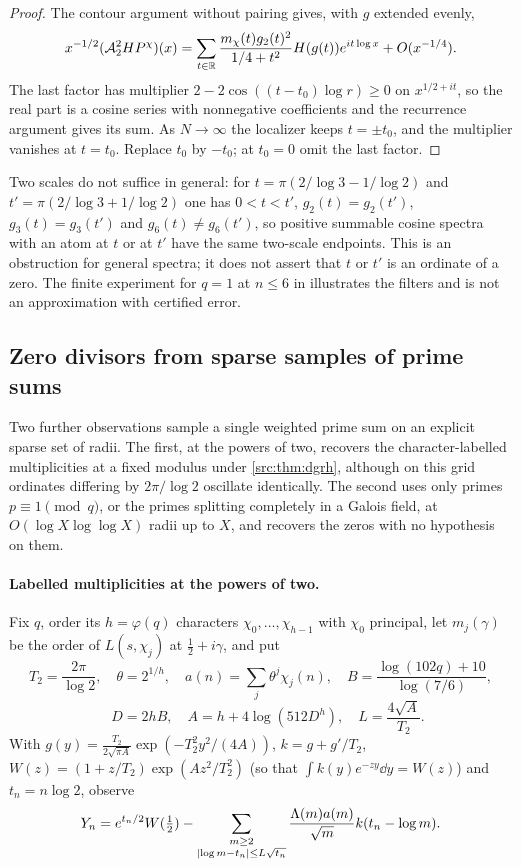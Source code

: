 \begin{proof}
The contour argument without pairing gives, with $g$ extended evenly,
\[
 x^{-1/2}(\mathcal{A}_2^2HP^\chi)(x)=\sum_{t\in\mathbb{R}}\frac{m_\chi(t)g_2(t)^2}{1/4+t^2}H(g(t))e^{it\log x}+O(x^{-1/4}).
\] The last factor has multiplier $2-2\cos((t-t_0)\log r)\ge0$ on
$x^{1/2+it}$, so the real part is a cosine series with nonnegative coefficients and the recurrence
argument gives its sum. As $N\to\infty$ the localizer keeps $t=\pm t_0$, and the multiplier vanishes
at $t=t_0$. Replace $t_0$ by $-t_0$; at $t_0=0$ omit the last factor.
\end{proof}

Two scales do not suffice in general: for $t=\pi(2/\log3-1/\log2)$ and $t'=\pi(2/\log3+1/\log2)$
one has $0<t<t'$, $g_2(t)=g_2(t')$, $g_3(t)=g_3(t')$ and $g_6(t)\ne g_6(t')$, so positive
summable cosine spectra with an atom at $t$ or at $t'$ have the same two-scale endpoints. This is
an obstruction for general spectra; it does not assert that $t$ or $t'$ is an ordinate of a zero.
The finite experiment for $q=1$ at $n\le6$ in
 illustrates the filters and is not an
approximation with certified error.

\subsection{Zero divisors from sparse samples of prime sums}\label{rec:sec:sparse}

Two further observations sample a single weighted prime sum on an explicit sparse set of radii.
The first, at the powers of two, recovers the character-labelled multiplicities at a fixed modulus
under \cref{src:thm:dgrh}, although on this grid ordinates differing by $2\pi/\log2$ oscillate
identically. The second uses only primes $p\equiv1\pmod q$, or the primes splitting completely in a
Galois field, at $O(\log X\log\log X)$ radii up to $X$, and recovers the zeros with no hypothesis on
them.

\paragraph{Labelled multiplicities at the powers of two.}
Fix $q$, order its $h=\varphi(q)$ characters $\chi_0,\dots,\chi_{h-1}$ with $\chi_0$ principal, let $m_j(\gamma)$ be the
order of $L(s,\chi_j)$ at $\tfrac12+i\gamma$, and put
\[
 T_2=\frac{2\pi}{\log2},\quad\theta=2^{1/h},\quad a(n)=\sum_j\theta^j\chi_j(n),\quad
 B=\frac{\log(102q)+10}{\log(7/6)},\]\[\quad D=2hB,\quad A=h+4\log(512D^h),\quad L=\frac{4\sqrt A}{T_2}.
\]
With $g(y)=\frac{T_2}{2\sqrt{\pi A}}\exp(-T_2^2y^2/(4A))$, $k=g+g'/T_2$, $W(z)=(1+z/T_2)\exp(Az^2/T_2^2)$ (so that
$\int k(y)e^{-zy}\dd y=W(z)$) and $t_n=n\log2$, observe
\[
 Y_n=e^{t_n/2}W(\tfrac12)-\sum_{\substack{m\ge2\\\lvert\log m-t_n\rvert\le L\sqrt{t_n}}}\frac{\Lambda(m)a(m)}{\sqrt m}k(t_n-\log m).
\]

